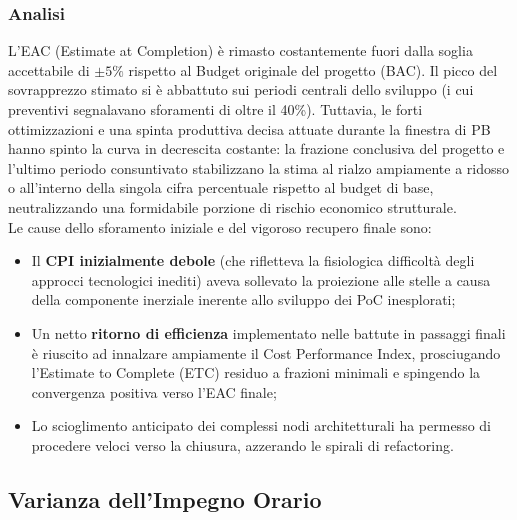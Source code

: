 \documentclass[a4paper,11pt,oneside]{scrartcl}
\begin{document}
\subsubsection*{Analisi}

L'EAC (Estimate at Completion) è rimasto costantemente fuori dalla soglia accettabile di $\pm 5\%$ rispetto al Budget originale del progetto (BAC). Il picco del sovrapprezzo stimato si è abbattuto sui periodi centrali dello sviluppo (i cui preventivi segnalavano sforamenti di oltre il 40\%). Tuttavia, le forti ottimizzazioni e una spinta produttiva decisa attuate durante la finestra di PB hanno spinto la curva in decrescita costante: la frazione conclusiva del progetto e l'ultimo periodo consuntivato stabilizzano la stima al rialzo ampiamente a ridosso o all'interno della singola cifra percentuale rispetto al budget di base, neutralizzando una formidabile porzione di rischio economico strutturale.\\
Le cause dello sforamento iniziale e del vigoroso recupero finale sono:
\begin{itemize}
    \item Il \textbf{CPI inizialmente debole} (che rifletteva la fisiologica difficoltà degli approcci tecnologici inediti) aveva sollevato la proiezione alle stelle a causa della componente inerziale inerente allo sviluppo dei PoC inesplorati;
    \item Un netto \textbf{ritorno di efficienza} implementato nelle battute in passaggi finali è riuscito ad innalzare ampiamente il Cost Performance Index, prosciugando l'Estimate to Complete (ETC) residuo a frazioni minimali e spingendo la convergenza positiva verso l'EAC finale;
    \item Lo scioglimento anticipato dei complessi nodi architetturali ha permesso di procedere veloci verso la chiusura, azzerando le spirali di refactoring.
\end{itemize}

\subsection{Varianza dell'Impegno Orario}
\end{document}
